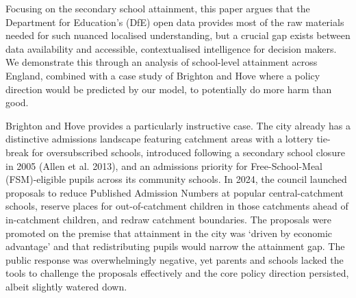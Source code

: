 \documentclass[
  12pt,
  titlepage]{article}
\begin{document}
Focusing on the secondary school attainment, this paper argues that the
Department for Education's (DfE) open data provides most of the raw
materials needed for such nuanced localised understanding, but a crucial
gap exists between data availability and accessible, contextualised
intelligence for decision makers. We demonstrate this through an
analysis of school-level attainment across England, combined with a case
study of Brighton and Hove where a policy direction would be predicted
by our model, to potentially do more harm than good.

Brighton and Hove provides a particularly instructive case. The city
already has a distinctive admissions landscape featuring catchment areas
with a lottery tie-break for oversubscribed schools, introduced
following a secondary school closure in 2005 (Allen et al. 2013), and an
admissions priority for Free-School-Meal (FSM)-eligible pupils across
its community schools. In 2024, the council launched proposals to reduce
Published Admission Numbers at popular central-catchment schools,
reserve places for out-of-catchment children in those catchments ahead
of in-catchment children, and redraw catchment boundaries. The proposals
were promoted on the premise that attainment in the city was `driven by
economic advantage' and that redistributing pupils would narrow the
attainment gap. The public response was overwhelmingly negative, yet
parents and schools lacked the tools to challenge the proposals
effectively and the core policy direction persisted, albeit slightly
watered down.
\end{document}
